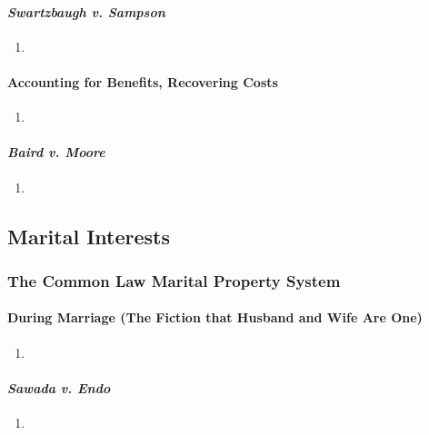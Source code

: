 \paragraph{\emph{Swartzbaugh v. Sampson}}

\begin{enumerate}
    \item %
\end{enumerate}

\paragraph{Accounting for Benefits, Recovering Costs}

\begin{enumerate}
    \item %
\end{enumerate}

\paragraph{\emph{Baird v. Moore}}

\begin{enumerate}
    \item %
\end{enumerate}

\subsection{Marital Interests}

\subsubsection{The Common Law Marital Property System}

\paragraph{During Marriage (The Fiction that Husband and Wife Are One)}

\begin{enumerate}
    \item %
\end{enumerate}

\paragraph{\emph{Sawada v. Endo}}

\begin{enumerate}
    \item %
\end{enumerate}

